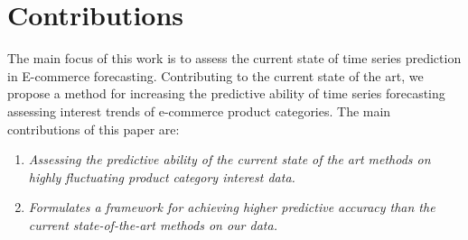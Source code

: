 \section{Contributions}
\label{sections:Introduction:Contributions}

The main focus of this work is to assess the current state of time series prediction in E-commerce forecasting.
Contributing to the current state of the art,
we propose a method for increasing the predictive ability of time series forecasting
assessing interest trends of e-commerce product categories.
The main contributions of this paper are:

\begin{enumerate}
    \item {\it Assessing the predictive ability of the current state of the art methods on highly fluctuating product category interest data.}
    \item {\it Formulates a framework for achieving higher predictive accuracy than the current state-of-the-art methods on our data.}
\end{enumerate}


\iffalse
The main description of the contributions will come in chapter~\ref{cont} after the results are presented. This section just provides a brief summary of the main contributions of the work. This section can also be left out, leaving all discussions in chapter~\ref{cont}.

The format of this section will generally follow the following format:
{\it
Donec non turpis nec neque egestas faucibus nec id neque. Etiam consectetur, odio vitae gravida tempus, diam velit sagittis turpis, a molestie ligula tellus at nunc. Nam convallis consequat vestibulum. Proin dolor neque, dapibus a pellentesque a, commodo a nibh.}

\begin{enumerate}
\item {\it Lorem ipsum dolor sit amet, consectetur adipiscing elit.}
\item {\it Lorem ipsum dolor sit amet, consectetur adipiscing elit.}
\item {\it Lorem ipsum dolor sit amet, consectetur adipiscing elit.}
\end{enumerate}
\fi
